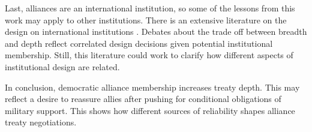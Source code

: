 \documentclass[12pt]{article}
\begin{document}
Last, alliances are an international institution, so some of the lessons from this work may apply to other institutions. 
There is an extensive literature on the design on international institutions \citep{DownesRocke1995, MartinSimmons1998, Koremenosetal2001, Koremenos2005, Thompson2010}.
Debates about the trade off between breadth and depth \citep{Downsetal1998, Gilligan2004} reflect correlated design decisions given potential institutional membership. 
Still, this literature could work to clarify how different aspects of institutional design are related. 


In conclusion, democratic alliance membership increases treaty depth. 
This may reflect a desire to reassure allies after pushing for conditional obligations of military support. 
This shows how different sources of reliability shapes alliance treaty negotiations. 



\singlespace
 
 
\end{document}
